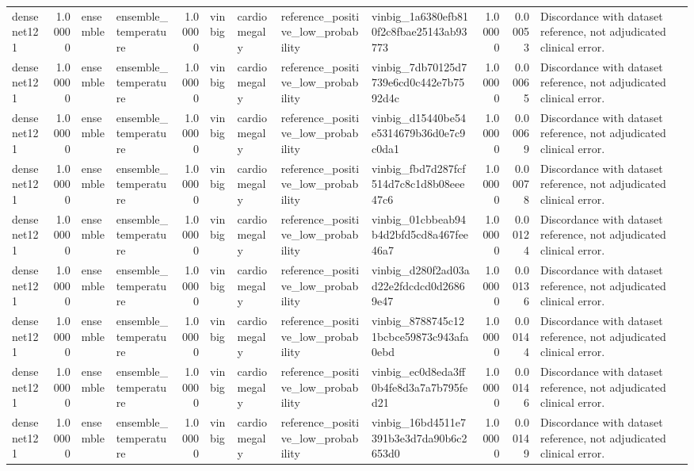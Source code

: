 \begin{tabular}{lrllrllllrrl}
densenet121 & 1.00000 & ensemble & ensemble\_temperature & 1.00000 & vinbig & cardiomegaly & reference\_positive\_low\_probability & vinbig\_1a6380efb810f2c8fbae25143ab93773 & 1.00000 & 0.00053 & Discordance with dataset reference, not adjudicated clinical error. \\
densenet121 & 1.00000 & ensemble & ensemble\_temperature & 1.00000 & vinbig & cardiomegaly & reference\_positive\_low\_probability & vinbig\_7db70125d7739e6cd0c442e7b7592d4c & 1.00000 & 0.00065 & Discordance with dataset reference, not adjudicated clinical error. \\
densenet121 & 1.00000 & ensemble & ensemble\_temperature & 1.00000 & vinbig & cardiomegaly & reference\_positive\_low\_probability & vinbig\_d15440be54e5314679b36d0e7c9c0da1 & 1.00000 & 0.00069 & Discordance with dataset reference, not adjudicated clinical error. \\
densenet121 & 1.00000 & ensemble & ensemble\_temperature & 1.00000 & vinbig & cardiomegaly & reference\_positive\_low\_probability & vinbig\_fbd7d287fcf514d7c8c1d8b08eee47c6 & 1.00000 & 0.00078 & Discordance with dataset reference, not adjudicated clinical error. \\
densenet121 & 1.00000 & ensemble & ensemble\_temperature & 1.00000 & vinbig & cardiomegaly & reference\_positive\_low\_probability & vinbig\_01cbbeab94b4d2bfd5cd8a467fee46a7 & 1.00000 & 0.00124 & Discordance with dataset reference, not adjudicated clinical error. \\
densenet121 & 1.00000 & ensemble & ensemble\_temperature & 1.00000 & vinbig & cardiomegaly & reference\_positive\_low\_probability & vinbig\_d280f2ad03ad22e2fdcdcd0d26869e47 & 1.00000 & 0.00136 & Discordance with dataset reference, not adjudicated clinical error. \\
densenet121 & 1.00000 & ensemble & ensemble\_temperature & 1.00000 & vinbig & cardiomegaly & reference\_positive\_low\_probability & vinbig\_8788745c121bcbce59873c943afa0ebd & 1.00000 & 0.00144 & Discordance with dataset reference, not adjudicated clinical error. \\
densenet121 & 1.00000 & ensemble & ensemble\_temperature & 1.00000 & vinbig & cardiomegaly & reference\_positive\_low\_probability & vinbig\_ec0d8eda3ff0b4fe8d3a7a7b795fed21 & 1.00000 & 0.00146 & Discordance with dataset reference, not adjudicated clinical error. \\
densenet121 & 1.00000 & ensemble & ensemble\_temperature & 1.00000 & vinbig & cardiomegaly & reference\_positive\_low\_probability & vinbig\_16bd4511e7391b3e3d7da90b6c2653d0 & 1.00000 & 0.00149 & Discordance with dataset reference, not adjudicated clinical error. \\

\end{tabular}
